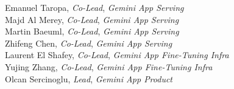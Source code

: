 \begin{minipage}[t]{0.50\linewidth}
Emanuel Taropa, \textit{Co-Lead}, \textit{Gemini App Serving} \\
Majd Al Merey, \textit{Co-Lead}, \textit{Gemini App Serving} \\
Martin Baeuml, \textit{Co-Lead}, \textit{Gemini App Serving} \\
Zhifeng Chen, \textit{Co-Lead}, \textit{Gemini App Serving} \\
Laurent El Shafey, \textit{Co-Lead}, \textit{Gemini App Fine-Tuning Infra} \\
Yujing Zhang, \textit{Co-Lead}, \textit{Gemini App Fine-Tuning Infra} \\
Olcan Sercinoglu, \textit{Lead}, \textit{Gemini App Product} \\
\end{minipage}
